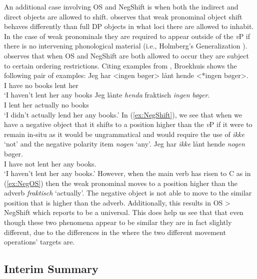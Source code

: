 \documentclass[12pt, letterpaper]{article}
\begin{document}
An additional case involving OS and NegShift is when both the indirect and direct objects are allowed to shift. \citet[417f]{broekhuisUnificationObjectShift2020} observes that weak pronominal object shift behaves differently than full DP objects in what loci there are allowed to inhabit. In the case of weak pronominals they are required to appear outside of the \textit{v}P if there is no intervening phonological material (i.e., Holmberg's Generalization \cite{holmbergWordOrderSyntactic1986,holmbergRemarksHolmbergGeneralization1999}). \citeauthor{broekhuisUnificationObjectShift2020} observes that when OS and NegShift are both allowed to occur they are subject to certain ordering restrictions. Citing examples from \citet[163ff]{christensenInterfacesNegationSyntax2005}, Broekhuis shows the following pair of examples:
	\ea 
		\ea \label{ex:NegShift}
		\gll Jeg har <ingen bøger> lånt hende <*ingen bøger>.\\
		I have no books lent her\\
		\glt `I haven't lent her any books
		\ex \label{ex:NegOS}
		\gll Jeg lånte \textit{henda} fraktisch \textit{ingen} \textit{bøger}.\\
		I lent her actually no books\\
		\glt `I didn't actually lend her any books.'
		\z 
	\z
In (\ref{ex:NegShift}), we see that when we have a negative object that it shifts to a position higher than the \textit{v}P if it were to remain in-situ as it would be ungrammatical and would require the use of \textit{ikke} `not' and the negative polarity item \textit{nogen} `any'.
	\ea
	\gll Jeg har \textit{ikke} lånt hende \textit{nogen} bøger.\\
	I have not lent her any books.\\
	\glt `I haven't lent her any books.'
	\z
However, when the main verb has risen to C as in (\ref{ex:NegOS}) then the weak pronominal moves to a position higher than the adverb \textit{fraktisch} `actually'. The negative object is not able to move to the similar position that is higher than the adverb. Additionally, this results in OS > NegShift which \citeauthor{broekhuisUnificationObjectShift2020} reports to be a universal. This does help us see that that even though these two phenomena appear to be similar they are in fact slightly different, due to the differences in the where the two different movement operations' targets are.

\subsection{Interim Summary} \label{sec:SUMMARY}
\end{document}
